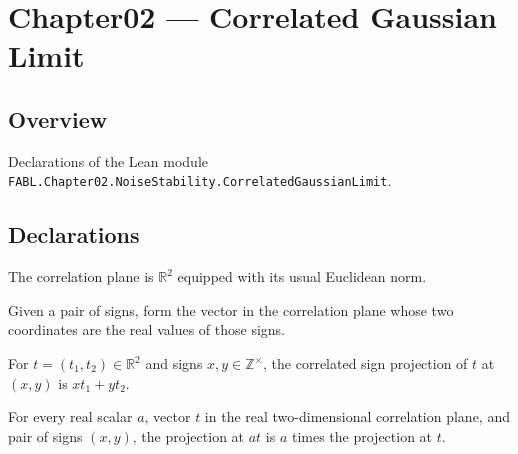 \chapter{Chapter02 — Correlated Gaussian Limit}
\section{Overview}

Declarations of the Lean module \texttt{FABL.Chapter02.NoiseStability.CorrelatedGaussianLimit}.

\section{Declarations}

\begin{definition}
\label{FABL.CorrelationPlane}
\leanok
The correlation plane is $\mathbb R^2$ equipped with its usual Euclidean norm.
\end{definition}

\begin{definition}
\label{FABL.correlatedSignVector}
\leanok
{}
Given a pair of signs, form the vector in the correlation plane whose two coordinates
are the real values of those signs.
\end{definition}

\begin{definition}
\label{FABL.correlatedSignProjection}
\leanok
{}
For $t=(t_1,t_2)\in\mathbb{R}^2$ and signs $x,y\in\mathbb{Z}^{\times}$, the correlated sign projection
of $t$ at $(x,y)$ is $xt_1+yt_2$.
\end{definition}

\begin{theorem}
\label{FABL.correlatedSignProjection_smul}
\leanok
{}
For every real scalar $a$, vector $t$ in the real two-dimensional correlation plane, and
pair of signs $(x,y)$, the projection at $a t$ is $a$ times the projection at $t$.
\end{theorem}

